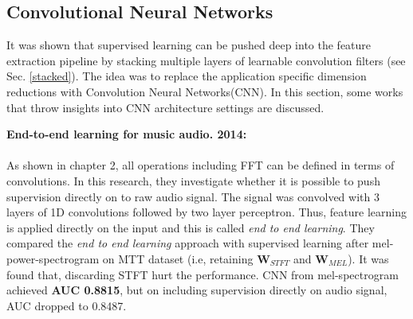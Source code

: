 \subsection{Convolutional Neural Networks}
\label{convolution}
It was shown that supervised learning can be pushed deep into the feature extraction pipeline by stacking multiple layers of learnable convolution filters (see Sec. \ref{stacked}). The idea was to replace the application specific dimension reductions with Convolution Neural Networks(CNN). In this section, some works that throw insights into CNN architecture settings are discussed. 
\bigskip

\noindent \textbf{End-to-end learning for music audio. 2014\cite{EndToEnd}:}\\
\\
\noindent As shown in chapter 2, all operations including FFT can be defined in terms of convolutions. In this research, they investigate whether it is possible to push supervision directly on to raw audio signal. The signal was convolved with 3 layers of 1D convolutions followed by two layer perceptron. Thus, feature learning is applied directly on the input and this is called\textit{ end to end learning}. They compared the \textit{end to end learning} approach with supervised learning after mel-power-spectrogram on MTT dataset (i.e, retaining $\textbf{W}_{STFT}$ and $\textbf{W}_{MEL}$). It was found that, discarding STFT hurt the performance. CNN from mel-spectrogram achieved \textbf{AUC 0.8815}, but on including supervision directly on audio signal, AUC dropped to 0.8487.     
 
